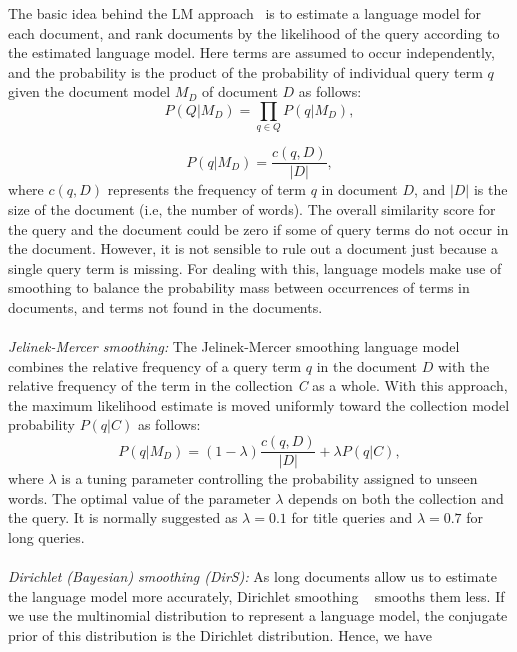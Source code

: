 The basic idea behind the LM approach~\citep{zhai2004study} is to estimate a language model for each document, and rank documents by the likelihood of the query according to the estimated language model. Here terms are assumed to occur independently, and the probability is the product of the probability of individual query term $q$ given the document model $ M_{D} $ of document $ D $ as follows:
\begin{equation}
\label{eq:multinomial}
 P(Q|M_{D}) = \prod\limits_{q\in Q} P(q|M_{D}), 
\end{equation}

\begin{equation}
\label{eq:multinomial}
 P(q|M_{D}) = \frac{c(q,D)}{|D|},
\end{equation}
where $ c(q,D) $ represents the frequency of term $ q $ in document $ D $, and $ |D| $ is the size of the document (i.e, the number of words). 
The overall similarity score for the query and the document could be zero if some of query terms do not occur in the document. However, it is not sensible to rule out a document just because a single query term is missing. For dealing with this, language models make use of smoothing to balance the probability mass between occurrences of terms in documents, and terms not found in the documents.
\\\\
\textit{Jelinek-Mercer smoothing:} The Jelinek-Mercer smoothing language model~\citep{zhai2004study} combines the relative frequency of a query term $q$ in the document $ D $ with the relative frequency of the term in the collection \textit{C} as a whole. With this approach, the maximum likelihood estimate is moved uniformly toward the collection model probability $ P(q|C) $ as follows:
\begin{equation}
P(q|M_{D}) = (1-\lambda)\frac{c(q,D)}{|D|}+\lambda P(q|C), 
\label{eq:jmsmoothing}
\end{equation} 
where $ \lambda $ is a tuning parameter controlling the probability assigned to unseen words. The optimal value of the parameter $ \lambda $ depends on both the collection and the query. It is normally suggested as $ \lambda = 0.1$ for title queries and $ \lambda = 0.7$ for long queries.
\\\\
\textit{Dirichlet (Bayesian) smoothing (DirS):} As long documents allow us to estimate the language model more accurately, Dirichlet smoothing ~\citep{zhai2004study} smooths them less. If we use the multinomial distribution to represent a language model, the conjugate prior of this distribution is the Dirichlet distribution. Hence, we have
